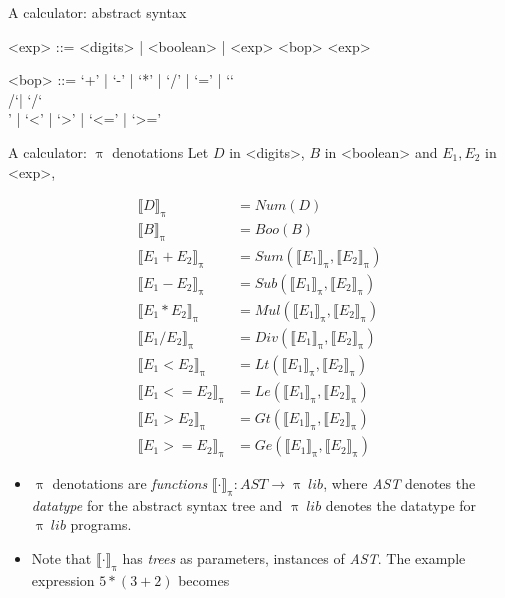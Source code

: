 \documentclass{beamer}
\newcommand{\BS}{\char`\\}
\begin{document}

\begin{frame}[fragile]{A calculator: abstract syntax}
\begin{grammar}
<exp> ::= <digits> | <boolean> | <exp> <bop> <exp> 

<bop> ::= `+' | `-' | `*' | `/' | `=' | `\BS/`| `/\BS' | `<' | `>' | `<=' | `>=' 
\end{grammar}
\end{frame}


\begin{frame}{A calculator: {\color{red}$\uppi$} denotations}
Let $D$ in <digits>, $B$ in <boolean> and $E_1, E_2$ in <exp>,

\begin{footnotesize}
\begin{align}
\label{eq:dig}\llbracket D \rrbracket_{\uppi} & = Num(D) \\
\llbracket B \rrbracket_{\uppi} & = Boo(B) \\
\label{eq:add}\llbracket E_1 + E_2 \rrbracket_{\uppi} & = Sum(\llbracket E_1 \rrbracket_{\uppi}, \llbracket E_2 \rrbracket_{\uppi}) \\
\llbracket E_1 - E_2 \rrbracket_{\uppi} & = Sub(\llbracket E_1 \rrbracket_{\uppi}, \llbracket E_2 \rrbracket_{\uppi}) \\
\label{eq:mul}\llbracket E_1 * E_2 \rrbracket_{\uppi} & = Mul(\llbracket E_1 \rrbracket_{\uppi}, \llbracket E_2 \rrbracket_{\uppi}) \\
\llbracket E_1 / E_2 \rrbracket_{\uppi} & = Div(\llbracket E_1 \rrbracket_{\uppi}, \llbracket E_2 \rrbracket_{\uppi}) \\
\llbracket E_1 < E_2 \rrbracket_{\uppi} & = Lt(\llbracket E_1 \rrbracket_{\uppi}, \llbracket E_2 \rrbracket_{\uppi}) \\
\llbracket E_1 {<=} E_2 \rrbracket_{\uppi} & = Le(\llbracket E_1 \rrbracket_{\uppi}, \llbracket E_2 \rrbracket_{\uppi}) \\
\llbracket E_1 > E_2 \rrbracket_{\uppi} & = Gt(\llbracket E_1 \rrbracket_{\uppi}, \llbracket E_2 \rrbracket_{\uppi}) \\
\llbracket E_1 {>\!=} E_2 \rrbracket_{\uppi} & = Ge(\llbracket E_1 \rrbracket_{\uppi}, \llbracket E_2 \rrbracket_{\uppi}) 
\end{align}
\end{footnotesize}

\framebreak 

\begin{itemize}
\item {\color{red}$\uppi$} denotations are \emph{functions} $\llbracket \cdot \rrbracket_\uppi : \mathit{AST} \to \uppi \ \mathit{lib}$, where 
\emph{AST} denotes the \emph{datatype} for the abstract syntax tree and $\uppi \ \mathit{lib}$ denotes the datatype for {\color{red}$\uppi \ \mathit{lib}$} programs. 
\item Note that $\llbracket \cdot \rrbracket_\uppi$ has \emph{trees} as parameters, instances of \emph{AST}. The example expression $5 * (3 + 2)$ becomes


\end{itemize}
\end{frame}
\end{document}
